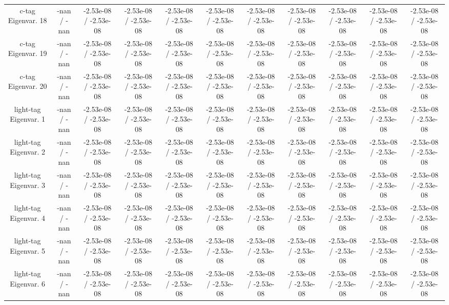 \begin{table}[htbp]
\begin{center}
\begin{tabular}{|c|c|c|c|c|c|c|c|c|c|c|}
  c-tag Eigenvar. 18 & -nan / -nan & -2.53e-08 / -2.53e-08 & -2.53e-08 / -2.53e-08 & -2.53e-08 / -2.53e-08 & -2.53e-08 / -2.53e-08 & -2.53e-08 / -2.53e-08 & -2.53e-08 / -2.53e-08 & -2.53e-08 / -2.53e-08 & -2.53e-08 / -2.53e-08 & -2.53e-08 / -2.53e-08 \\ 
  c-tag Eigenvar. 19 & -nan / -nan & -2.53e-08 / -2.53e-08 & -2.53e-08 / -2.53e-08 & -2.53e-08 / -2.53e-08 & -2.53e-08 / -2.53e-08 & -2.53e-08 / -2.53e-08 & -2.53e-08 / -2.53e-08 & -2.53e-08 / -2.53e-08 & -2.53e-08 / -2.53e-08 & -2.53e-08 / -2.53e-08 \\ 
  c-tag Eigenvar. 20 & -nan / -nan & -2.53e-08 / -2.53e-08 & -2.53e-08 / -2.53e-08 & -2.53e-08 / -2.53e-08 & -2.53e-08 / -2.53e-08 & -2.53e-08 / -2.53e-08 & -2.53e-08 / -2.53e-08 & -2.53e-08 / -2.53e-08 & -2.53e-08 / -2.53e-08 & -2.53e-08 / -2.53e-08 \\ 
  light-tag Eigenvar. 1 & -nan / -nan & -2.53e-08 / -2.53e-08 & -2.53e-08 / -2.53e-08 & -2.53e-08 / -2.53e-08 & -2.53e-08 / -2.53e-08 & -2.53e-08 / -2.53e-08 & -2.53e-08 / -2.53e-08 & -2.53e-08 / -2.53e-08 & -2.53e-08 / -2.53e-08 & -2.53e-08 / -2.53e-08 \\ 
  light-tag Eigenvar. 2 & -nan / -nan & -2.53e-08 / -2.53e-08 & -2.53e-08 / -2.53e-08 & -2.53e-08 / -2.53e-08 & -2.53e-08 / -2.53e-08 & -2.53e-08 / -2.53e-08 & -2.53e-08 / -2.53e-08 & -2.53e-08 / -2.53e-08 & -2.53e-08 / -2.53e-08 & -2.53e-08 / -2.53e-08 \\ 
  light-tag Eigenvar. 3 & -nan / -nan & -2.53e-08 / -2.53e-08 & -2.53e-08 / -2.53e-08 & -2.53e-08 / -2.53e-08 & -2.53e-08 / -2.53e-08 & -2.53e-08 / -2.53e-08 & -2.53e-08 / -2.53e-08 & -2.53e-08 / -2.53e-08 & -2.53e-08 / -2.53e-08 & -2.53e-08 / -2.53e-08 \\ 
  light-tag Eigenvar. 4 & -nan / -nan & -2.53e-08 / -2.53e-08 & -2.53e-08 / -2.53e-08 & -2.53e-08 / -2.53e-08 & -2.53e-08 / -2.53e-08 & -2.53e-08 / -2.53e-08 & -2.53e-08 / -2.53e-08 & -2.53e-08 / -2.53e-08 & -2.53e-08 / -2.53e-08 & -2.53e-08 / -2.53e-08 \\ 
  light-tag Eigenvar. 5 & -nan / -nan & -2.53e-08 / -2.53e-08 & -2.53e-08 / -2.53e-08 & -2.53e-08 / -2.53e-08 & -2.53e-08 / -2.53e-08 & -2.53e-08 / -2.53e-08 & -2.53e-08 / -2.53e-08 & -2.53e-08 / -2.53e-08 & -2.53e-08 / -2.53e-08 & -2.53e-08 / -2.53e-08 \\ 
  light-tag Eigenvar. 6 & -nan / -nan & -2.53e-08 / -2.53e-08 & -2.53e-08 / -2.53e-08 & -2.53e-08 / -2.53e-08 & -2.53e-08 / -2.53e-08 & -2.53e-08 / -2.53e-08 & -2.53e-08 / -2.53e-08 & -2.53e-08 / -2.53e-08 & -2.53e-08 / -2.53e-08 & -2.53e-08 / -2.53e-08 \\ 

\end{tabular}
\end{center}
\end{table}
